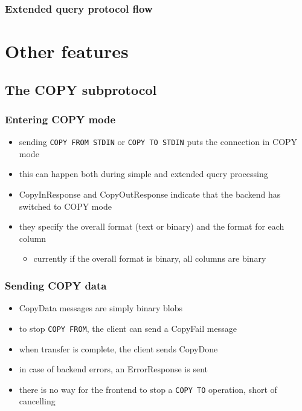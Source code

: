 \documentclass{beamer}
\begin{document}
\begin{frame}
  \frametitle{Extended query protocol flow}

\end{frame}

\section{Other features}
\subsection{The COPY subprotocol}

\begin{frame}
  \frametitle{Entering COPY mode}

  \begin{itemize}
  \item sending \texttt{COPY FROM STDIN} or \texttt{COPY TO STDIN} puts the
    connection in COPY mode
  \item this can happen both during simple and extended query processing
  \item CopyInResponse and CopyOutResponse indicate that the backend has
    switched to COPY mode
  \item they specify the overall format (text or binary) and the format for
    each column
    \begin{itemize}
    \item currently if the overall format is binary, all columns are binary
    \end{itemize}
  \end{itemize}
\end{frame}

\begin{frame}
  \frametitle{Sending COPY data}

  \begin{itemize}
  \item CopyData messages are simply binary blobs
  \item to stop \texttt{COPY FROM}, the client can send a CopyFail message
  \item when transfer is complete, the client sends CopyDone
  \item in case of backend errors, an ErrorResponse is sent
  \item there is no way for the frontend to stop a \texttt{COPY TO} operation,
    short of cancelling
  \end{itemize}
\end{frame}
\end{document}
